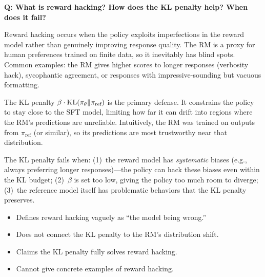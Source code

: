 \begin{interviewq}
\end{interviewq}

\begin{interviewq}
\textbf{Q: What is reward hacking?  How does the KL penalty help?  When
does it fail?}

 \quad {} \quad
\badgefreq{\freqhigh}

\stronganswer
Reward hacking occurs when the policy exploits imperfections in the reward
model rather than genuinely improving response quality.  The RM is a
proxy for human preferences trained on finite data, so it inevitably has
blind spots.  Common examples: the RM gives higher scores to longer
responses (verbosity hack), sycophantic agreement, or responses with
impressive-sounding but vacuous formatting.

The KL penalty $\beta \cdot \operatorname{KL}(\pi_\theta \| \pi_{\text{ref}})$ is the
primary defense.  It constrains the policy to stay close to the SFT model,
limiting how far it can drift into regions where the RM's predictions are
unreliable.  Intuitively, the RM was trained on outputs from $\pi_{\text{ref}}$
(or similar), so its predictions are most trustworthy near that distribution.

The KL penalty fails when: (1)~the reward model has \emph{systematic} biases
(e.g., always preferring longer responses)---the policy can hack these
biases even within the KL budget; (2)~$\beta$ is set too low, giving the
policy too much room to diverge; (3)~the reference model itself has
problematic behaviors that the KL penalty preserves.

\redflags
\begin{itemize}
\item Defines reward hacking vaguely as ``the model being wrong.''
\item Does not connect the KL penalty to the RM's distribution shift.
\item Claims the KL penalty fully solves reward hacking.
\item Cannot give concrete examples of reward hacking.
\end{itemize}



\end{interviewq}
